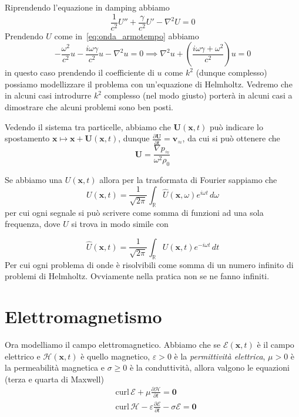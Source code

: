 Riprendendo l'equazione in damping abbiamo
\[
  \frac{1}{c^2} U'' + \frac{\gamma}{c^2} U' - \nabla ^2 U = 0
\]
Prendendo \(U\) come in~\eqref{eq:onda_armotempo} abbiamo
\[
  -\frac{\omega^2}{c^2} u - \frac{i\omega\gamma}{c^2}u - \nabla ^2 u = 0
  \implies \nabla ^2 u + {\left( \frac{i \omega\gamma + \omega^2}{c^2} \right)}
  u = 0
\]
in questo caso prendendo il coefficiente di \(u\) come \(k^2\) (dunque
complesso) possiamo modellizzare il problema con un'equazione di Helmholtz.
Vedremo che in alcuni casi introdurre \(k^2\) complesso (nel modo giusto)
porterà in alcuni casi a dimostrare che alcuni problemi sono ben posti.

Vedendo il sistema tra particelle, abbiamo che \(\mathbf{U} {(\mathbf{x} , t)}\) può
indicare lo spostamento \(\mathbf{x}  \mapsto \mathbf{x} + \mathbf{U}
{(\mathbf{x} , t)} \), dunque \(\frac{\partial \mathbf{U} }{\partial t} =
\mathbf{v} _\approx\), da cui si può ottenere che 
\[
  \mathbf{U} = \frac{\nabla p_\approx}{\omega^2\rho_{0}}
\]

\begin{remark}{}
    Se abbiamo una \(U{(\mathbf{x} , t)}\) allora per la trasformata di Fourier
    sappiamo che
    \[
      U{(\mathbf{x} , t)} = \frac{1}{\sqrt{2\pi}} \int _{\mathbb{R}}
      \widehat{U}{(\mathbf{x} , \omega)} e^{i\omega t} \,d\omega
    \]
    per cui ogni segnale si può scrivere come somma di funzioni ad una sola
    frequenza, dove \(\widehat{U}\) si trova in modo simile con

    \[
      \widehat{U}{(\mathbf{x} , t)} = \frac{1}{\sqrt{2\pi}} \int_{\mathbb{R}}
      U{(\mathbf{x} , t)}e^{-i\omega t} \,dt
    \]
    Per cui ogni problema di onde è risolvibili come somma di un numero infinito
    di problemi di Helmholtz. Ovviamente nella pratica non se ne fanno infiniti.
\end{remark}

\section{Elettromagnetismo}

Ora modelliamo il campo elettromagnetico. Abbiamo che se
\(\mathcal{E}{(\mathbf{x} , t)}\) è il campo elettrico e
\(\mathcal{H}{(\mathbf{x} , t)}\) è quello magnetico, \(\varepsilon > 0\) è la
\emph{permittività elettrica}, \(\mu > 0\) è la permeabilità magnetica e
\(\sigma \ge 0\) è la conduttività, allora valgono le equazioni (terza e quarta
di Maxwell)
\begin{align}\label{eq:Maxwell_last2}
    &\mathrm{curl} \,\mathcal{E} + \mu \frac{\partial \mathcal{H}}{\partial t} =
    \mathbf{0}  \\
    &\mathrm{curl} \,\mathcal{H} - \varepsilon \frac{\partial \mathcal{E}}{\partial
    t} - \sigma \mathcal{E} = \mathbf{0} 
\end{align}

